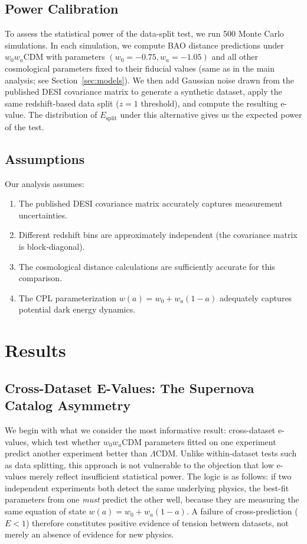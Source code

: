 \documentclass[11pt,a4paper]{article}
\newcommand{\LCDM}{$\Lambda$CDM}
\begin{document}
\subsection{Power Calibration}

To assess the statistical power of the data-split test, we run 500 Monte Carlo simulations. In each simulation, we compute BAO distance predictions under $w_0w_a$CDM with parameters $(w_0 = -0.75, w_a = -1.05)$ and all other cosmological parameters fixed to their fiducial values (same as in the main analysis; see Section~\ref{sec:models}). We then add Gaussian noise drawn from the published DESI covariance matrix to generate a synthetic dataset, apply the same redshift-based data split ($z = 1$ threshold), and compute the resulting e-value. The distribution of $E_{\text{split}}$ under this alternative gives us the expected power of the test.

\subsection{Assumptions}

Our analysis assumes:
\begin{enumerate}
    \item The published DESI covariance matrix accurately captures measurement uncertainties.
    \item Different redshift bins are approximately independent (the covariance matrix is block-diagonal).
    \item The cosmological distance calculations are sufficiently accurate for this comparison.
    \item The CPL parameterization $w(a) = w_0 + w_a(1-a)$ adequately captures potential dark energy dynamics.
\end{enumerate}

\section{Results}
\label{sec:results}

\subsection{Cross-Dataset E-Values: The Supernova Catalog Asymmetry}
\label{sec:cross}

We begin with what we consider the most informative result: cross-dataset e-values, which test whether $w_0w_a$CDM parameters fitted on one experiment predict another experiment better than \LCDM. Unlike within-dataset tests such as data splitting, this approach is not vulnerable to the objection that low e-values merely reflect insufficient statistical power. The logic is as follows: if two independent experiments both detect the same underlying physics, the best-fit parameters from one \textit{must} predict the other well, because they are measuring the same equation of state $w(a) = w_0 + w_a(1-a)$. A failure of cross-prediction ($E < 1$) therefore constitutes positive evidence of tension between datasets, not merely an absence of evidence for new physics.
\end{document}
